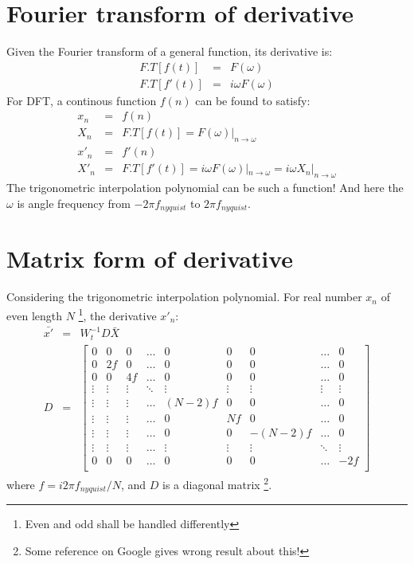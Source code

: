\documentclass[12pt]{article}
\begin{document}
\section{Fourier transform of derivative}

Given the Fourier transform of a general function, its derivative is:
\begin{eqnarray}
    F.T[f(t)]  &=& F(\omega)   \\
    F.T[f'(t)] &=& i\omega F(\omega)
\end{eqnarray}
For DFT, a continous function $f(n)$ can be found to satisfy:
\begin{eqnarray}
    x_n  &=& f(n)    \\
    X_n  &=& F.T[f(t)] = F(\omega)|_{n \to \omega} \\
    x'_n &=& f'(n) \\
    X'_n &=& F.T[f'(t)] = i\omega F(\omega)|_{n\to \omega} = i\omega X_n|_{n\to \omega} 
\end{eqnarray}
The trigonometric interpolation polynomial can be such a function! And here the $\omega$ is 
angle frequency from $-2\pi f_{nyquist}$ to $2\pi f_{nyquist}$.


\section{Matrix form of derivative}
Considering the trigonometric interpolation polynomial. For real number $x_n$ of even length $N$
\footnote{Even and odd shall be handled differently}, the derivative $x'_n$:
\begin{eqnarray}
    \bar{x'} & = & W_t^{-1} D \bar{X} \\
    D &=&
    \begin{bmatrix}
        0 & 0 & 0 & \ldots & 0 & 0 & 0 & \ldots & 0 \\
        0 & 2f & 0 & \ldots & 0 & 0 & 0 & \ldots & 0 \\
        0 & 0 & 4f & \ldots & 0 & 0 & 0 & \ldots & 0 \\
        \vdots & \vdots & \vdots & \ddots & \vdots & \vdots & \vdots & \vdots & \vdots \\
        \vdots & \vdots & \vdots & \ldots & (N-2)f & 0 & 0 & \ldots & 0 \\
        \vdots & \vdots & \vdots & \ldots & 0 & Nf & 0 & \ldots & 0 \\
        \vdots & \vdots & \vdots & \ldots & 0 & 0 & -(N-2)f & \ldots & 0 \\
        \vdots & \vdots & \vdots & \ldots & \vdots & \vdots & \vdots & \ddots & \vdots \\
        0 & 0 & 0 & \ldots & 0 & 0 & 0 & \ldots & -2f \\
    \end{bmatrix}
\end{eqnarray}
where $f=i2\pi f_{nyquist}/N$, and $D$ is a diagonal matrix
\footnote{Some reference on Google gives wrong result about this!}.
\end{document}
